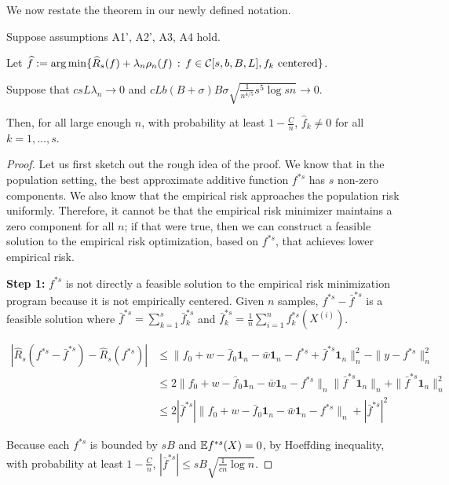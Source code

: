 We now restate the theorem in our newly defined notation.
 
\begin{theorem} 
Suppose assumptions A1', A2', A3, A4 hold. 

Let $\displaystyle \widehat{f} := \arg\min \{ \widehat{R}_s(f) + \lambda_n \rho_n(f) \,:\, f \in \mathcal{C}[s,b,B,L], f_k \textrm{ centered} \}$.

Suppose that $c s L \lambda_n \rightarrow 0$ and $c L b (B+\sigma)B\sigma \sqrt{\frac{1}{n^{4/5}} s^5 \log sn} \rightarrow 0$.

Then, for all large enough $n$, with probability at least $1-\frac{C}{n}$, $\hat{f}_k \neq 0$ for all $k =1,...,s$.
\end{theorem}

\begin{proof}
Let us first sketch out the rough idea of the proof. We know that in the population setting, the best approximate additive function $f^{*s}$ has $s$ non-zero components. We also know that the empirical risk approaches the population risk uniformly. Therefore, it cannot be that the empirical risk minimizer maintains a zero component for all $n$; if that were true, then we can construct a feasible solution to the empirical risk optimization, based on $f^{*s}$, that achieves lower empirical risk. 


\textbf{Step 1:} $f^{*s}$ is not directly a feasible solution to the empirical risk minimization program because it is not empirically centered. Given $n$ samples, $f^{*s} - \bar{f}^{*s}$ is a feasible solution where $\bar{f}^{*s} = \sum_{k=1}^s \bar{f}_k^{*s}$ and $\bar{f}_k^{*s} = \frac{1}{n} \sum_{i=1}^n f_k^{*s}(X^{(i)})$. 

\begin{align*}
|\hat{R}_s(f^{*s} - \bar{f}^{*s}) - \hat{R}_s(f^{*s})| &\leq 
               \| f_0 + w - \bar{f}_0 \mathbf{1}_n - \bar{w}\mathbf{1}_n 
                     - f^{*s} + \bar{f}^{*s}\mathbf{1}_n \|_n^2  - \| y - f^{*s}\|_n^2 \\
	&\leq 2\| f_0 + w - \bar{f}_0 \mathbf{1}_n - \bar{w} \mathbf{1}_n -f^{*s}\|_n 
                \|\bar{f}^{*s} \mathbf{1}_n \|_n 
                  + \|\bar{f}^{*s} \mathbf{1}_n \|_n^2 \\
        &\leq 2 | \bar{f}^{*s} | \| f_0 + w 
           - \bar{f}_0 \mathbf{1}_n - \bar{w} \mathbf{1}_n - f^{*s} \|_n + |\bar{f}^{*s}|^2 
\end{align*}

Because each $f^{*s}$ is bounded by $sB$ and ${\mathbb E} f^{*s}(X) = 0$, by Hoeffding inequality, with probability at least $1-\frac{C}{n}$, $|\bar{f}^{*s}| \leq sB \sqrt{\frac{1}{cn} \log n}$. 


\end{proof}
